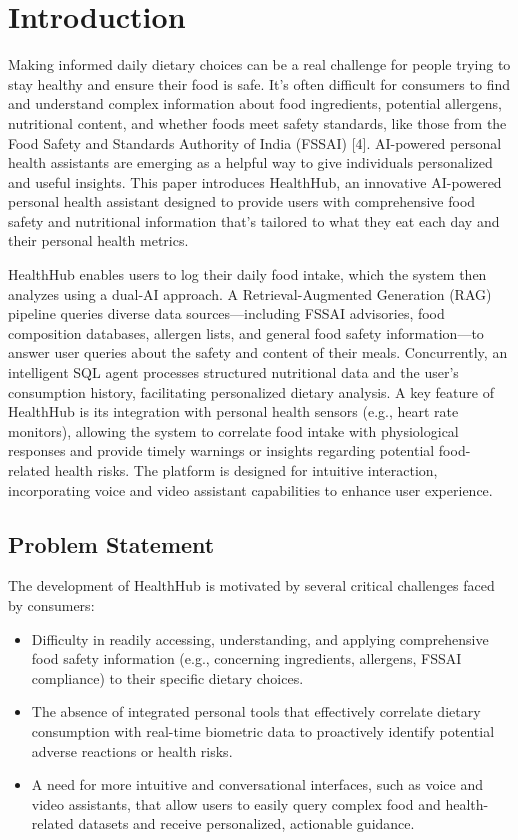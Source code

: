 \section{Introduction}

Making informed daily dietary choices can be a real challenge for people trying to stay healthy and ensure their food is safe. It's often difficult for consumers to find and understand complex information about food ingredients, potential allergens, nutritional content, and whether foods meet safety standards, like those from the Food Safety and Standards Authority of India (FSSAI) [4]. AI-powered personal health assistants are emerging as a helpful way to give individuals personalized and useful insights. This paper introduces HealthHub, an innovative AI-powered personal health assistant designed to provide users with comprehensive food safety and nutritional information that's tailored to what they eat each day and their personal health metrics.

HealthHub enables users to log their daily food intake, which the system then analyzes using a dual-AI approach. A Retrieval-Augmented Generation (RAG) pipeline queries diverse data sources—including FSSAI advisories, food composition databases, allergen lists, and general food safety information—to answer user queries about the safety and content of their meals. Concurrently, an intelligent SQL agent processes structured nutritional data and the user's consumption history, facilitating personalized dietary analysis. A key feature of HealthHub is its integration with personal health sensors (e.g., heart rate monitors), allowing the system to correlate food intake with physiological responses and provide timely warnings or insights regarding potential food-related health risks. The platform is designed for intuitive interaction, incorporating voice and video assistant capabilities to enhance user experience.

\subsection{Problem Statement}
The development of HealthHub is motivated by several critical challenges faced by consumers:
\begin{itemize}[noitemsep, topsep=0pt]
    \item Difficulty in readily accessing, understanding, and applying comprehensive food safety information (e.g., concerning ingredients, allergens, FSSAI compliance) to their specific dietary choices.
    \item The absence of integrated personal tools that effectively correlate dietary consumption with real-time biometric data to proactively identify potential adverse reactions or health risks.
    \item A need for more intuitive and conversational interfaces, such as voice and video assistants, that allow users to easily query complex food and health-related datasets and receive personalized, actionable guidance.
\end{itemize}

